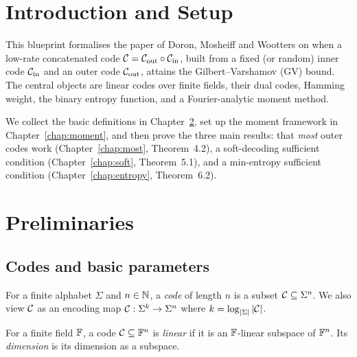 %

\chapter{Introduction and Setup}

This blueprint formalises the paper of Doron, Mosheiff and Wootters on when a
low-rate concatenated code $\mathcal{C} = \mathcal{C}_{\mathrm{out}} \circ \mathcal{C}_{\mathrm{in}}$, built from a fixed (or
random) inner code $\mathcal{C}_{\mathrm{in}}$ and an outer code $\mathcal{C}_{\mathrm{out}}$, attains the
Gilbert--Varshamov (GV) bound. The central objects are linear codes over finite
fields, their dual codes, Hamming weight, the binary entropy function, and a
Fourier-analytic moment method.

We collect the basic definitions in Chapter~\ref{chap:prelim}, set up the moment
framework in Chapter~\ref{chap:moment}, and then prove the three main results:
that \emph{most} outer codes work (Chapter~\ref{chap:most}, Theorem~4.2), a
soft-decoding sufficient condition (Chapter~\ref{chap:soft}, Theorem~5.1), and a
min-entropy sufficient condition (Chapter~\ref{chap:entropy}, Theorem~6.2).

\chapter{Preliminaries}
\label{chap:prelim}

\section{Codes and basic parameters}

\begin{definition}[Code]
  \label{def:code}
  For a finite alphabet $\Sigma$ and $n \in \mathbb{N}$, a \emph{code} of length $n$ is a
  subset $\mathcal{C} \subseteq \Sigma^n$. We also view $\mathcal{C}$ as an encoding map
  $\mathcal{C} : \Sigma^k \to \Sigma^n$ where $k = \log_{|\Sigma|}|\mathcal{C}|$.
\end{definition}

\begin{definition}
  \label{def:linear-code}
  For a finite field $\mathbb{F}$, a code $\mathcal{C} \subseteq \mathbb{F}^n$ is \emph{linear} if it
  is an $\mathbb{F}$-linear subspace of $\mathbb{F}^n$. Its \emph{dimension} is its dimension as
  a subspace.
\end{definition}

